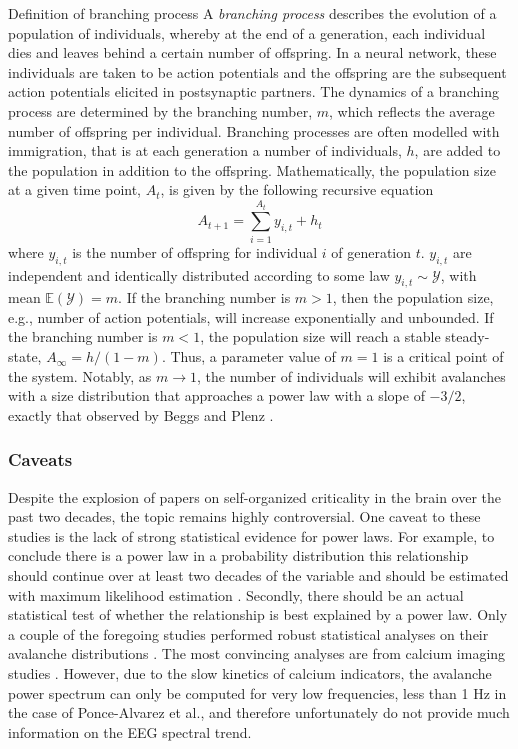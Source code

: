 \begin{mybox}[floatplacement=t,label={box:first}]{Definition of branching process}
   A \textit{branching process} describes the evolution of a population of individuals, whereby at the end of a generation, each individual dies and leaves behind a certain number of offspring. In a neural network, these individuals are taken to be action potentials and the offspring are the subsequent action potentials elicited in postsynaptic partners. The dynamics of a branching process are determined by the branching number, $m$, which reflects the average number of offspring per individual. Branching processes are often modelled with immigration, that is at each generation a number of individuals, $h$, are added to the population in addition to the offspring. Mathematically, the population size at a given time point, $A_t$, is given by the following recursive equation \cite{Wilting2018}
    \begin{equation}
        A_{t+1} = \sum_{i=1}^{A_{t}} y_{i,t} + h_t
    \end{equation}
    where $y_{i,t}$ is the number of offspring for individual $i$ of generation $t$.  $y_{i,t}$ are independent and identically distributed according to some law $y_{i,t}\sim\mathcal{Y}$, with mean $\mathbb{E}(\mathcal{Y})=m$. If the branching number is $m>1$, then the population size, e.g., number of action potentials, will increase exponentially and unbounded. If the branching number is $m<1$, the population size will reach a stable steady-state, $A_{\infty}=h/(1-m)$. Thus, a parameter value of $m=1$ is a critical point of the system. Notably, as $m\to1$, the number of individuals will exhibit avalanches with a size distribution that approaches a power law with a slope of $-3/2$, exactly that observed by Beggs and Plenz \cite{Beggs2003}.
\end{mybox}


\subsubsection{Caveats}

Despite the explosion of papers on self-organized criticality in the brain over the past two decades, the topic remains highly controversial. One caveat to these studies is the lack of strong statistical evidence for power laws. For example, to conclude there is a power law in a probability distribution this relationship should continue over at least two decades of the variable and should be estimated with maximum likelihood estimation \cite{Stumpf2012}. Secondly, there should be an actual statistical test of whether the relationship is best explained by a power law. Only a couple of the foregoing studies performed robust statistical analyses on their avalanche distributions \cite{Clauset2009}. The most convincing analyses are from calcium imaging studies \cite{Bellay2015, Ponce-Alvarez2018}. However, due to the slow kinetics of calcium indicators, the avalanche power spectrum can only be computed for very low frequencies, less than 1 Hz in the case of Ponce-Alvarez et al.\cite{Ponce-Alvarez2018}, and therefore unfortunately do not provide much information on the EEG spectral trend. 

